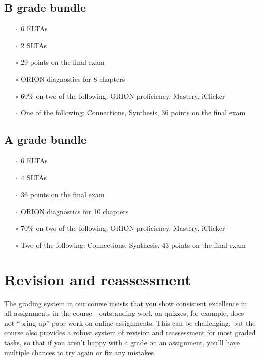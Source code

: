 \hypertarget{b-grade-bundle}{%
\subsection{B grade bundle}\label{b-grade-bundle}}

\begin{itemize}
\tightlist
\item[$\square$]
  6 ELTAs
\item[$\square$]
  2 SLTAs
\item[$\square$]
  29 points on the final exam
\item[$\square$]
  ORION diagnostics for 8 chapters
\item[$\square$]
  60\% on two of the following: ORION proficiency, Mastery, iClicker
\item[$\square$]
  One of the following: Connections, Synthesis, 36 points on the final
  exam
\end{itemize}

\hypertarget{a-grade-bundle}{%
\subsection{A grade bundle}\label{a-grade-bundle}}

\begin{itemize}
\tightlist
\item[$\square$]
  6 ELTAs
\item[$\square$]
  4 SLTAs
\item[$\square$]
  36 points on the final exam
\item[$\square$]
  ORION diagnostics for 10 chapters
\item[$\square$]
  70\% on two of the following: ORION proficiency, Mastery, iClicker
\item[$\square$]
  Two of the following: Connections, Synthesis, 43 points on the final
  exam
\end{itemize}

\hypertarget{revisions}{%
\section{Revision and reassessment}\label{revisions}}

The grading system in our course insists that you show consistent
excellence in all assignments in the course---outstanding work on
quizzes, for example, does not ``bring up'' poor work on online
assignments. This can be challenging, but the course also provides a
robust system of revision and reassessment for most graded tasks, so
that if you aren't happy with a grade on an assignment, you'll have
multiple chances to try again or fix any mistakes.

